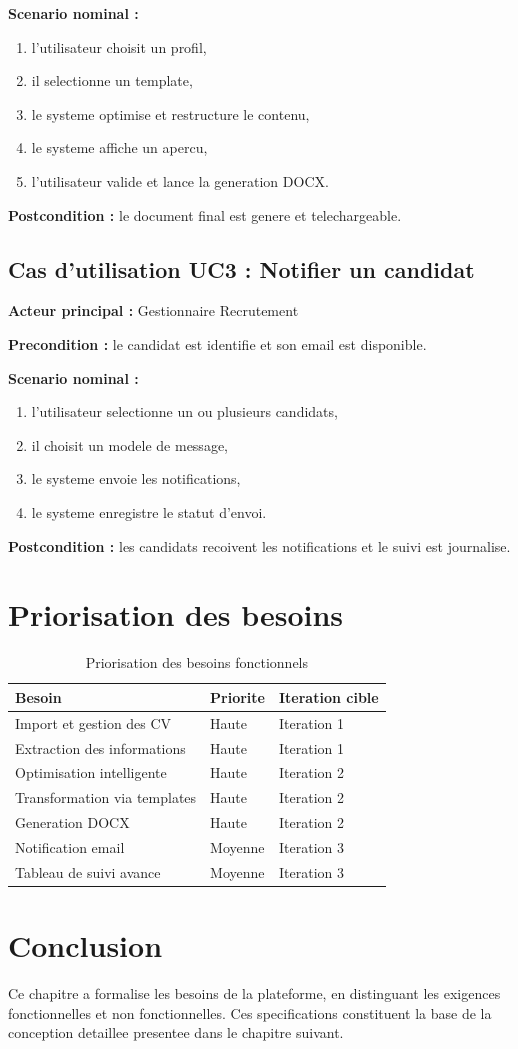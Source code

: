 \textbf{Scenario nominal :}
\begin{enumerate}
    \item l'utilisateur choisit un profil,
    \item il selectionne un template,
    \item le systeme optimise et restructure le contenu,
    \item le systeme affiche un apercu,
    \item l'utilisateur valide et lance la generation DOCX.
\end{enumerate}

\textbf{Postcondition :} le document final est genere et telechargeable.

\subsection{Cas d'utilisation UC3 : Notifier un candidat}
\textbf{Acteur principal :} Gestionnaire Recrutement

\textbf{Precondition :} le candidat est identifie et son email est disponible.

\textbf{Scenario nominal :}
\begin{enumerate}
    \item l'utilisateur selectionne un ou plusieurs candidats,
    \item il choisit un modele de message,
    \item le systeme envoie les notifications,
    \item le systeme enregistre le statut d'envoi.
\end{enumerate}

\textbf{Postcondition :} les candidats recoivent les notifications et le suivi est journalise.

\section{Priorisation des besoins}
\begin{table}[H]
\centering
\begin{tabular}{p{6cm}p{3cm}p{3cm}}
\toprule
\textbf{Besoin} & \textbf{Priorite} & \textbf{Iteration cible} \\
\midrule
Import et gestion des CV & Haute & Iteration 1 \\
Extraction des informations & Haute & Iteration 1 \\
Optimisation intelligente & Haute & Iteration 2 \\
Transformation via templates & Haute & Iteration 2 \\
Generation DOCX & Haute & Iteration 2 \\
Notification email & Moyenne & Iteration 3 \\
Tableau de suivi avance & Moyenne & Iteration 3 \\
\bottomrule
\end{tabular}
\caption{Priorisation des besoins fonctionnels}
\label{tab:priorisation-besoins}
\end{table}

\section{Conclusion}
Ce chapitre a formalise les besoins de la plateforme, en distinguant les exigences fonctionnelles et non fonctionnelles. Ces specifications constituent la base de la conception detaillee presentee dans le chapitre suivant.
